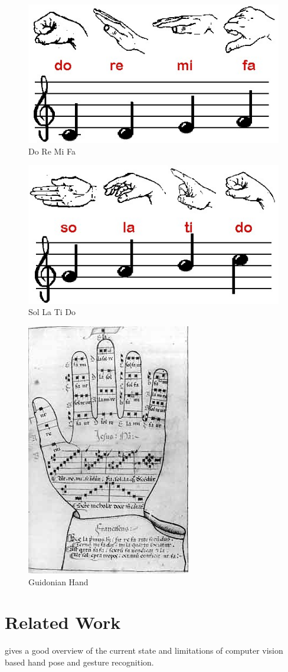 \begin{figure}[htbp]
	\center{}
	\label{fig:doremifa}
	\includegraphics[width=0.3\linewidth]{figures/doremifa.jpg}
	\caption{Do Re Mi Fa}
\end{figure}

\begin{figure}[htbp]
	\center{}
	\label{fig:solatido}
	\includegraphics[width=0.3\linewidth]{figures/solatido.jpg}
	\caption{Sol La Ti Do}
\end{figure}

\begin{figure}[htbp]
	\center{}
	\label{fig:guidonian}
	\includegraphics[width=0.3\linewidth]{figures/guidonian_hand.jpg}
	\caption{Guidonian Hand}
\end{figure}


\section{Related Work}
\cite{Erol2007} gives a good overview of the current state and limitations of computer vision based hand pose and gesture recognition.



